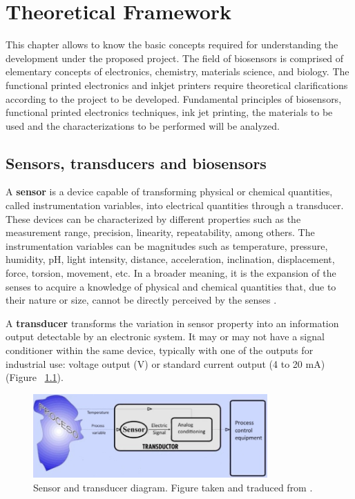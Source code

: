 \chapter{Theoretical Framework}
This chapter allows to know the basic concepts required for understanding the development under the proposed project. The field of biosensors is comprised of elementary concepts of electronics, chemistry, materials science, and biology. The functional printed electronics and inkjet printers require theoretical clarifications according to the project to be developed. Fundamental principles of biosensors, functional printed electronics techniques, ink jet printing, the materials to be used and the characterizations to be performed will be analyzed.

\section{Sensors, transducers and biosensors}
A \textbf{sensor} is a device capable of transforming physical or chemical quantities, called instrumentation variables, into electrical quantities through a transducer. These devices can be characterized by different properties such as the measurement range, precision, linearity, repeatability, among others. The instrumentation variables can be magnitudes such as temperature, pressure, humidity, pH, light intensity, distance, acceleration, inclination, displacement, force, torsion, movement, etc. In a broader meaning, it is the expansion of the senses to acquire a knowledge of physical and chemical quantities that, due to their nature or size, cannot be directly perceived by the senses \cite{PallasAreny}.

A \textbf{transducer} transforms the variation in sensor property into an information output detectable by an electronic system. It may or may not have a signal conditioner within the same device, typically with one of the outputs for industrial use: voltage output (V) or standard current output (4 to 20 mA)(Figure ~\ref{fig:Figura_concepto_sensor}).

\begin{figure}[H]
  \centering
    \includegraphics[width=0.8\textwidth]{Figures/Figura_concepto_sensor}
  \caption{Sensor and transducer diagram. Figure taken and traduced from \cite{Hector1}.}
  \label{fig:Figura_concepto_sensor}
\end{figure}

